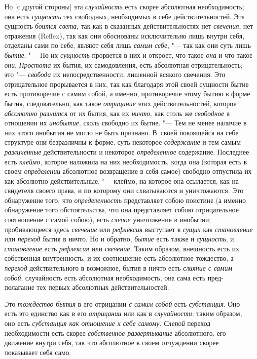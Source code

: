 Но [с другой стороны] эта {\em случайность} есть скорее
абсолютная необходимость; она есть {\em сущность} тех
свободных, необходимых в себе действительностей. Эта сущность
{\em боится света}, так как в сказанных
действительностях нет {\em свечения}, нет отражения
(Reflex), так как они обоснованы исключительно лишь внутри себя, отделаны
сами по себе, являют себя лишь {\em самим себе}, "--- так
как они суть лишь {\em бытие}. "--- Но их
{\em сущность} прорвется в них и откроет, что такое
{\em она} и что такое {\em они}.
{\em Простота} их бытия, их самодовления, есть
абсолютная отрицательность; это "--- {\em свобода} их
непосредственности, лишенной всякого свечения. Это отрицательное
прорывается в них, так как благодаря этой своей сущности бытие есть
противоречие с самим собой, а именно, противоречие этому бытию в форме
бытия, следовательно, как такое {\em отрицание} этих
действительностей, которое {\em абсолютно разнится} от
их бытия, как их {\em ничто}, как столь же
{\em свободное} в отношении их
{\em инобытие}, сколь свободно их бытие. "--- Тем не менее
наличие в них этого инобытия не могло не быть признано. В~своей покоящейся
на себе структуре они безразличны к форме, суть некоторое
{\em содержание} и тем самым
{\em различенные} действительности и некоторое
{\em определенное} содержание. Последнее есть
{\em клеймо}, которое наложила на них необходимость,
когда она (которая есть в своем {\em определении}
абсолютное возвращение в себя самое) свободно отпустила их как абсолютно
действительные, "--- клеймо, на которое она ссылается, как на свидетеля своего
права, и по которому они схватываются и уничтожаются. Это обнаружение того,
что {\em определенность} представляет собою поистине (а
именно обнаружение того обстоятельства, что она представляет собою
отрицательное соотношение с самой собою), есть
{\em слепое} уничтожение в инобытии; пробивающееся
здесь {\em свечение} или
{\em рефлексия} выступает в
{\em сущих} как {\em становление}
или {\em переход} бытия в ничто. Но и обратно,
{\em бытие} есть также и
{\em сущность}, и {\em становление}
есть {\em рефлексия} или
{\em свечение}. Таким образом, внешность есть их
собственная внутренность, и их соотношение есть абсолютное тождество, а
{\em переход} действительного в возможное, бытия в
ничто есть {\em слияние с самим собой}; случайность
есть абсолютная необходимость, она сама есть пред-полагание тех первых
абсолютных действительностей.

Это {\em тождество бытия} в его отрицании
{\em с самим собой} есть
{\em субстанция}. Оно есть это единство как в его
{\em отрицании} или как в
{\em случайности}; таким образом, оно есть
{\em субстанция как отношение к себе самому}.
{\em Слепой} переход необходимости есть скорее
{\em собственное развертывание} абсолютного, его
движение внутри себя, так что абсолютное в своем отчуждении скорее
показывает себя само.


